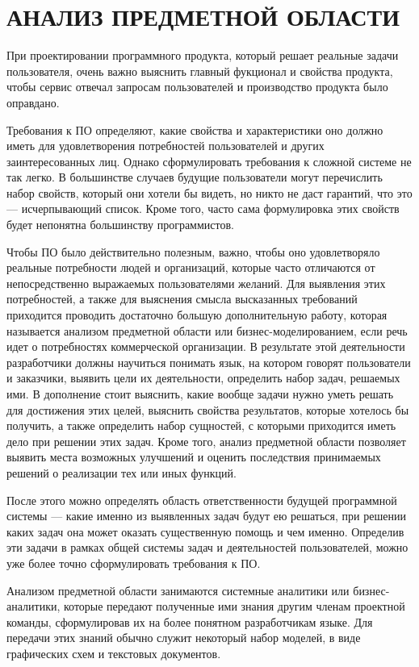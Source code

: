 \section{АНАЛИЗ ПРЕДМЕТНОЙ ОБЛАСТИ}
\label{sec:analysis}

При проектировании программного продукта, который решает реальные задачи пользователя, очень важно выяснить главный фукционал и свойства продукта, чтобы сервис отвечал запросам пользователей и производство продукта было оправдано.

Требования к ПО определяют, какие свойства и характеристики оно должно иметь для удовлетворения потребностей пользователей и других заинтересованных лиц. Однако сформулировать требования к сложной системе не так легко. В большинстве случаев будущие пользователи могут перечислить набор свойств, который они хотели бы видеть, но никто не даст гарантий, что это — исчерпывающий список. Кроме того, часто сама формулировка этих свойств будет непонятна большинству программистов.

Чтобы ПО было действительно полезным, важно, чтобы оно удовлетворяло реальные потребности людей и организаций, которые часто отличаются от непосредственно выражаемых пользователями желаний. Для выявления этих потребностей, а также для выяснения смысла высказанных требований приходится проводить достаточно большую дополнительную работу, которая называется анализом предметной области или бизнес-моделированием, если речь идет о потребностях коммерческой организации. В результате этой деятельности разработчики должны научиться понимать язык, на котором говорят пользователи и заказчики, выявить цели их деятельности, определить набор задач, решаемых ими. В дополнение стоит выяснить, какие вообще задачи нужно уметь решать для достижения этих целей, выяснить свойства результатов, которые хотелось бы получить, а также определить набор сущностей, с которыми приходится иметь дело при решении этих задач. Кроме того, анализ предметной области позволяет выявить места возможных улучшений и оценить последствия принимаемых решений о реализации тех или иных функций.

После этого можно определять область ответственности будущей программной системы — какие именно из выявленных задач будут ею решаться, при решении каких задач она может оказать существенную помощь и чем именно. Определив эти задачи в рамках общей системы задач и деятельностей пользователей, можно уже более точно сформулировать требования к ПО.

Анализом предметной области занимаются системные аналитики или бизнес-аналитики, которые передают полученные ими знания другим членам проектной команды, сформулировав их на более понятном разработчикам языке. Для передачи этих знаний обычно служит некоторый набор моделей, в виде графических схем и текстовых документов.

